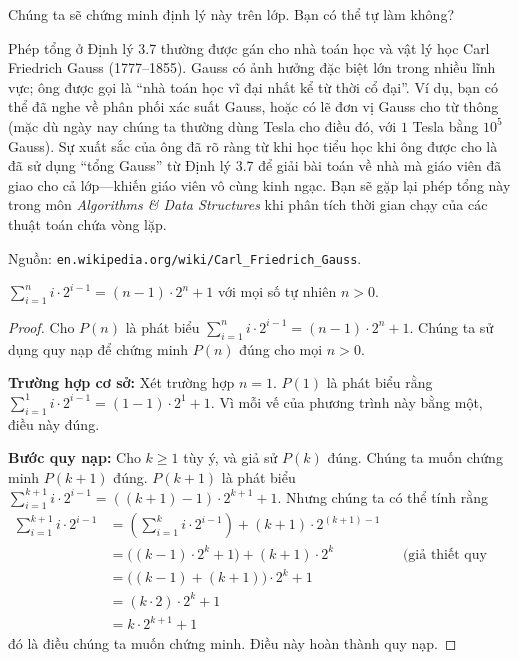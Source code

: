 Chúng ta sẽ chứng minh định lý này trên lớp. Bạn có thể tự làm không?

\begin{infobox}
Phép tổng ở Định lý 3.7 thường được gán cho nhà toán học và vật lý học Carl Friedrich Gauss (1777--1855). Gauss có ảnh hưởng đặc biệt lớn trong nhiều lĩnh vực; ông được gọi là ``nhà toán học vĩ đại nhất kể từ thời cổ đại''. Ví dụ, bạn có thể đã nghe về phân phối xác suất Gauss, hoặc có lẽ đơn vị Gauss cho từ thông (mặc dù ngày nay chúng ta thường dùng Tesla cho điều đó, với $1$ Tesla bằng $10^5$ Gauss). Sự xuất sắc của ông đã rõ ràng từ khi học tiểu học khi ông được cho là đã sử dụng ``tổng Gauss'' từ Định lý 3.7 để giải bài toán về nhà mà giáo viên đã giao cho cả lớp---khiến giáo viên vô cùng kinh ngạc. Bạn sẽ gặp lại phép tổng này trong môn \emph{Algorithms \& Data Structures} khi phân tích thời gian chạy của các thuật toán chứa vòng lặp.

Nguồn: \texttt{en.wikipedia.org/wiki/Carl\_Friedrich\_Gauss}.
\end{infobox}

\begin{theorem}
$\displaystyle\sum_{i=1}^{n} i \cdot 2^{i-1} = (n-1) \cdot 2^n + 1$ với mọi số tự nhiên $n > 0$.
\end{theorem}

\begin{proof}
Cho $P(n)$ là phát biểu $\displaystyle\sum_{i=1}^{n} i \cdot 2^{i-1} = (n-1) \cdot 2^n + 1$. Chúng ta sử dụng quy nạp để chứng minh $P(n)$ đúng cho mọi $n > 0$.

\textbf{Trường hợp cơ sở:} Xét trường hợp $n = 1$. $P(1)$ là phát biểu rằng $\displaystyle\sum_{i=1}^{1} i \cdot 2^{i-1} = (1-1) \cdot 2^1 + 1$. Vì mỗi vế của phương trình này bằng một, điều này đúng.

\textbf{Bước quy nạp:} Cho $k \geq 1$ tùy ý, và giả sử $P(k)$ đúng. Chúng ta muốn chứng minh $P(k+1)$ đúng. $P(k+1)$ là phát biểu $\displaystyle\sum_{i=1}^{k+1} i \cdot 2^{i-1} = ((k+1)-1) \cdot 2^{k+1} + 1$. Nhưng chúng ta có thể tính rằng
\begin{align*}
\sum_{i=1}^{k+1} i \cdot 2^{i-1} &= \left(\sum_{i=1}^{k} i \cdot 2^{i-1}\right) + (k+1) \cdot 2^{(k+1)-1} \\
&= \big((k-1) \cdot 2^k + 1\big) + (k+1) \cdot 2^k && \text{(giả thiết quy nạp)}\\
&= \big((k-1) + (k+1)\big) \cdot 2^k + 1 \\
&= (k \cdot 2) \cdot 2^k + 1 \\
&= k \cdot 2^{k+1} + 1
\end{align*}
đó là điều chúng ta muốn chứng minh. Điều này hoàn thành quy nạp.
\end{proof}

